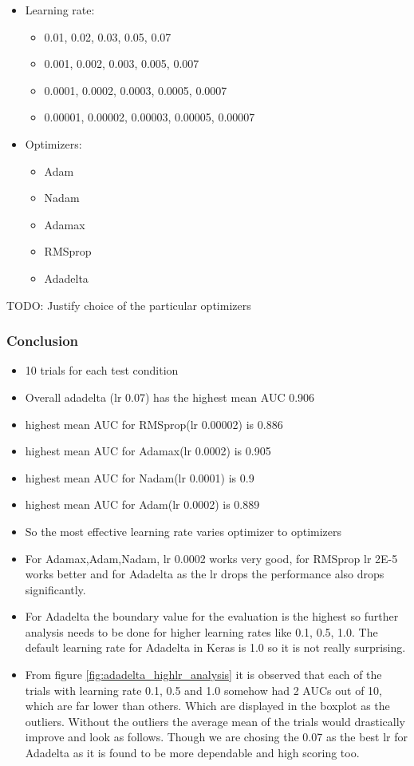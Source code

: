 \begin{itemize}
 \item Learning rate:
  \begin{itemize}
    \item 0.01, 0.02, 0.03, 0.05, 0.07
    \item 0.001, 0.002, 0.003, 0.005, 0.007
    \item 0.0001, 0.0002, 0.0003, 0.0005, 0.0007
    \item 0.00001, 0.00002, 0.00003, 0.00005, 0.00007
  \end{itemize}
 \item Optimizers:
 \begin{itemize}
    \item Adam
    \item Nadam
    \item Adamax
    \item RMSprop
    \item Adadelta
 \end{itemize}
\end{itemize}
TODO: Justify choice of the particular optimizers



\subsubsection{Conclusion} 
\begin{itemize}
    \item 10 trials for each test condition
    \item Overall adadelta (lr 0.07) has the highest mean AUC 0.906
    \item highest mean AUC for RMSprop(lr 0.00002) is 0.886
    \item highest mean AUC for Adamax(lr 0.0002) is 0.905
    \item highest mean AUC for Nadam(lr 0.0001) is 0.9
    \item highest mean AUC for Adam(lr 0.0002) is 0.889
    \item So the most effective learning rate varies optimizer to optimizers
    \item For Adamax,Adam,Nadam, lr 0.0002 works very good, for RMSprop lr 2E-5 works better and for Adadelta as the lr drops the performance also drops significantly.
    \item For Adadelta the boundary value for the evaluation is the highest so further analysis needs to be done for higher learning rates like 0.1, 0.5, 1.0. The default learning rate for Adadelta in Keras is 1.0 so it
    is not really surprising.
    \item From figure \ref{fig:adadelta_highlr_analysis} it is observed that each of the trials with learning rate 0.1, 0.5 and 1.0 somehow had 2 AUCs out of 10, which are far lower than others. Which are displayed in 
    the boxplot as the outliers. Without the outliers the average mean of the trials would drastically improve and look as follows. Though we are chosing the 0.07 as the best lr for Adadelta as it is found to be more 
    dependable and high scoring too.
\end{itemize}

